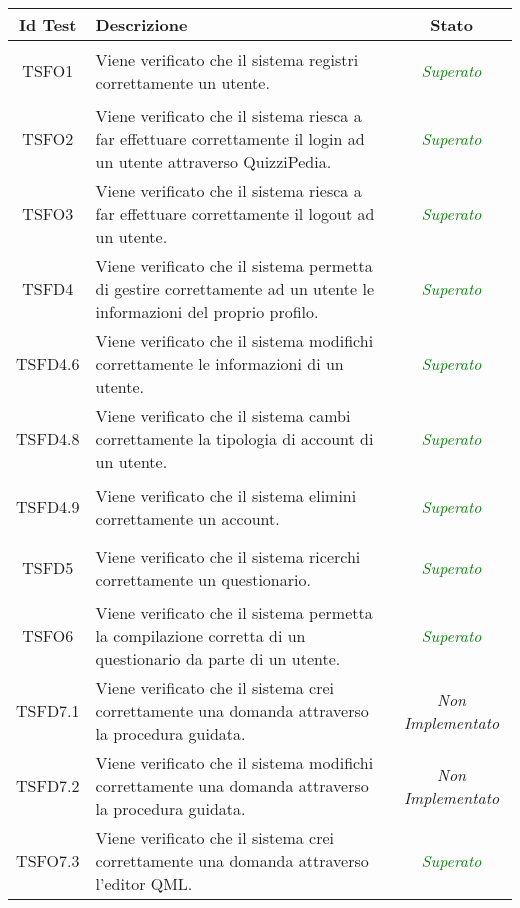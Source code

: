 \normalsize
\begin{longtable}{|c|>{}m{8cm}|c|}
\hline 
\textbf{Id Test} & \textbf{Descrizione} & \textbf{Stato}\\
\hline
\endhead
\hypertarget{TSFO1}{TSFO1} & Viene verificato che il sistema registri correttamente un utente. & \textcolor{Green}{\textit{Superato}}\\ \hline
\hypertarget{TSFO2}{TSFO2} & Viene verificato che il sistema riesca a far effettuare correttamente il login ad un utente attraverso QuizziPedia. & \textcolor{Green}{\textit{Superato}}\\ \hline
\hypertarget{TSFO3}{TSFO3} & Viene verificato che il sistema riesca a far effettuare correttamente il logout ad un utente.  & \textcolor{Green}{\textit{Superato}}\\ \hline
\hypertarget{TSFD4}{TSFD4} & Viene verificato che il sistema permetta di gestire correttamente ad un utente le informazioni del proprio profilo. & \textcolor{Green}{\textit{Superato}}\\ \hline
\hypertarget{TSFD4.6}{TSFD4.6} & Viene verificato che il sistema modifichi correttamente le informazioni di un utente. & \textcolor{Green}{\textit{Superato}}\\ \hline
\hypertarget{TSFD4.8}{TSFD4.8} & Viene verificato che il sistema cambi correttamente la tipologia di account di un utente. & \textcolor{Green}{\textit{Superato}}\\ \hline
\hypertarget{TSFD4.9}{TSFD4.9} & Viene verificato che il sistema elimini correttamente un account. & \textcolor{Green}{\textit{Superato}}\\ \hline
\hypertarget{TSFD5}{TSFD5} & Viene verificato che il sistema ricerchi correttamente un questionario. & \textcolor{Green}{\textit{Superato}}\\ \hline
\hypertarget{TSFO6}{TSFO6} & Viene verificato che il sistema permetta la compilazione corretta di un questionario da parte di un utente. & \textcolor{Green}{\textit{Superato}}\\ \hline
\hypertarget{TSFD7.1}{TSFD7.1} & Viene verificato che il sistema crei correttamente una domanda attraverso la procedura guidata. & \textit{Non Implementato}\\ \hline
\hypertarget{TSFD7.2}{TSFD7.2} & Viene verificato che il sistema modifichi correttamente una domanda attraverso la procedura guidata. & \textit{Non Implementato}\\ \hline
\hypertarget{TSFO7.3}{TSFO7.3} & Viene verificato che il sistema crei correttamente una domanda attraverso l’editor QML. & \textcolor{Green}{\textit{Superato}}\\ \hline

\end{longtable}
